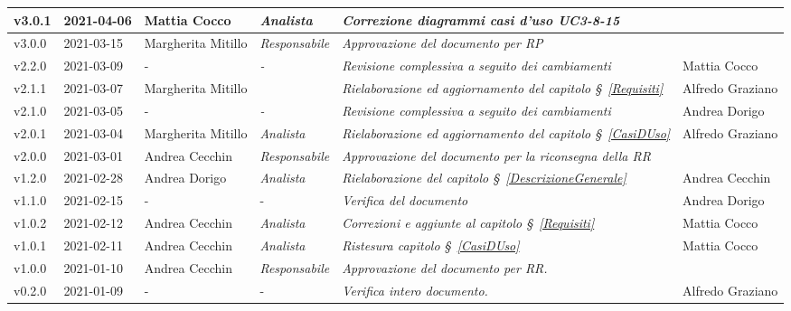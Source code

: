 {\begin{center}
\begin{longtable}[c]{|p{2cm-1\tabcolsep}|p{2cm}|p{3cm-2\tabcolsep}|p{}|p{}|p{3cm}|}
		\hline
		\centering v3.0.1 & 2021-04-06 & Mattia Cocco & \centering \textit{Analista} & \textit{Correzione diagrammi casi d'uso UC3-8-15} & \makecell[c]{Andrea Cecchin}\\
		\hline
		\centering v3.0.0 & 2021-03-15 & Margherita Mitillo & \centering \textit{Responsabile} & \textit{Approvazione del documento per RP} & \makecell[c]{-}\\
		\hline
		\centering v2.2.0 & 2021-03-09 &\centering - & \centering \textit{-} &\textit{Revisione complessiva a seguito dei cambiamenti} & Mattia Cocco\\
		\hline
		\centering v2.1.1 & 2021-03-07 & Margherita Mitillo & \centering{ \textit{Analista} }&\textit{Rielaborazione ed aggiornamento del capitolo \S~\ref{Requisiti}} &  Alfredo Graziano  \\
		\hline
		\centering v2.1.0 & 2021-03-05 &\centering - & \centering \textit{-} &  \textit{Revisione complessiva a seguito dei cambiamenti}  & Andrea Dorigo\\
		\hline
		\centering v2.0.1 & 2021-03-04 & Margherita Mitillo & \centering \textit{Analista} &\textit{Rielaborazione ed aggiornamento del capitolo \S~\ref{CasiDUso}} & Alfredo Graziano  \\
		\hline
		\centering v2.0.0 & 2021-03-01 & Andrea Cecchin & \centering \textit{Responsabile} &\textit{Approvazione del documento per la riconsegna della RR} &  \makecell[c]{-}\\
		\hline
		\centering v1.2.0 & 2021-02-28 & Andrea Dorigo & \centering \textit{Analista} &\textit{Rielaborazione del capitolo \S~\ref{DescrizioneGenerale}} & Andrea Cecchin  \\
		\hline
		\centering v1.1.0 & 2021-02-15 & \centering - & \centering - &\textit{Verifica del documento} & Andrea Dorigo  \\
		\hline
		\centering v1.0.2 & 2021-02-12 & Andrea Cecchin & \centering \textit{Analista} &\textit{Correzioni e aggiunte al capitolo \S~\ref{Requisiti}} & Mattia Cocco  \\
		\hline
		\centering v1.0.1 & 2021-02-11 & Andrea Cecchin & \centering \textit{Analista} &\textit{Ristesura capitolo \S~\ref{CasiDUso}} & Mattia Cocco  \\
		\hline
		\centering v1.0.0 & 2021-01-10 & Andrea Cecchin & \centering \textit{Responsabile} &\textit{Approvazione del documento per RR.} &  \makecell[c]{-}  \\
		\hline
		\centering v0.2.0 & 2021-01-09 & \centering - & \centering - &\textit{Verifica intero documento.} & Alfredo Graziano  \\

\end{longtable}
\end{center}}
